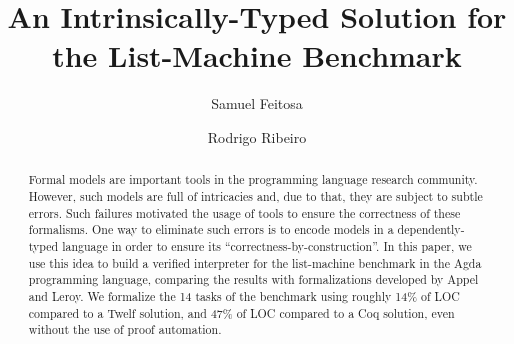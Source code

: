 \documentclass[sigconf]{acmart}
\theoremstyle{definition}
\begin{document}



\title{An Intrinsically-Typed Solution for the List-Machine Benchmark}

\author{Samuel Feitosa}
\authornotemark[1]

\author{Rodrigo Ribeiro}





\begin{abstract}
Formal models are important tools in the programming language research
community. However, such models are full of intricacies and, due to that,
they are subject to subtle errors. Such failures motivated the usage of
tools to ensure the correctness of these formalisms. One way to eliminate
such errors is to encode models in a dependently-typed language in order
to ensure its ``correctness-by-construction''. In this paper, we use this
idea to build a verified interpreter for the list-machine benchmark in the
Agda programming language, comparing the results with formalizations developed
by Appel and Leroy. We formalize the 14 tasks of the benchmark
using roughly 14\% of LOC compared to a Twelf solution, and 47\% of LOC
compared to a Coq solution, even without the use of proof automation.
\end{abstract}


\end{document}
